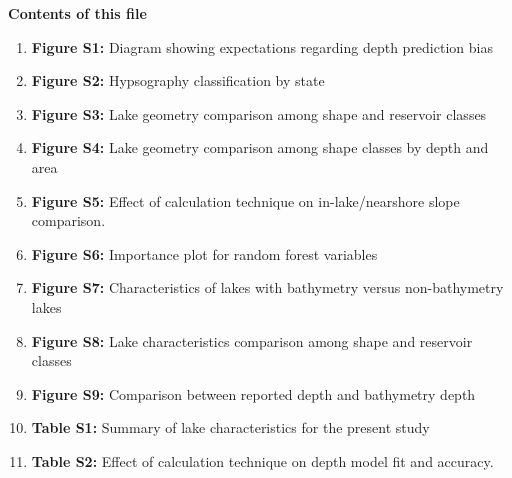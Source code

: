 \documentclass[draft,wrr]{agutexSI2019}
\begin{document}
\begin{article}




      \noindent\textbf{Contents of this file}
      \begin{enumerate}

            \item \textbf{Figure S1:} Diagram showing expectations regarding depth prediction bias

            \item \textbf{Figure S2:} Hypsography classification by state

            \item \textbf{Figure S3:} Lake geometry comparison among shape and reservoir classes

            \item \textbf{Figure S4:} Lake geometry comparison among shape classes by depth and area

            \item \textbf{Figure S5:} Effect of calculation technique on in-lake/nearshore slope comparison.

            \item \textbf{Figure S6:} Importance plot for random forest variables

            \item \textbf{Figure S7:} Characteristics of lakes with bathymetry versus non-bathymetry lakes

            \item \textbf{Figure S8:} Lake characteristics comparison among shape and reservoir classes

            \item \textbf{Figure S9:} Comparison between reported depth and bathymetry depth

            \item \textbf{Table S1:} Summary of lake characteristics for the present study

            \item \textbf{Table S2:} Effect of calculation technique on depth model fit and accuracy.

      \end{enumerate}
      \vspace{1em}


\end{article}
\end{document}
